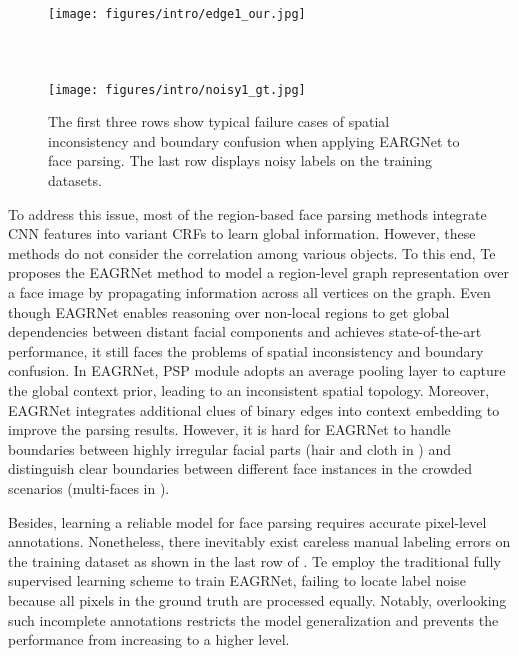 \documentclass[10pt,twocolumn,letterpaper]{article}
\begin{document}
\begin{figure}
{\begin{minipage}[t]{0.185\linewidth}
    \\ \\[-2.7ex]
    \texttt{[image: figures/intro/edge1\_our.jpg]}
    \\ \\[-2.7ex]
    \\ \\
    \texttt{[image: figures/intro/noisy1\_gt.jpg]}
    \end{minipage}
}
\vspace{-2.5mm}
\caption{The first three rows show typical failure cases of spatial inconsistency and boundary confusion when applying EARGNet \cite{te2020edge} to face parsing. The last row displays noisy labels on the training datasets.}
\vspace{-6mm}
\label{fig:failure_case_of_fcn}
\end{figure}

To address this issue, most of the region-based face parsing methods \cite{multi_objective, cnn_cascade, Zhou2017FacePV} integrate CNN features into variant CRFs to learn global information. However, these methods do not consider the correlation among various objects. To this end, Te \etal \cite{te2020edge} proposes the EAGRNet method to model a region-level graph representation over a face image by propagating information across all vertices on the graph. Even though EAGRNet enables reasoning over non-local regions to get global dependencies between distant facial components and achieves state-of-the-art performance, it still faces the problems of spatial inconsistency and boundary confusion. 
In EAGRNet, PSP module \cite{psp} adopts an average pooling layer \cite{Long_2015_CVPR} to capture the global context prior, leading to an inconsistent spatial topology. 
Moreover, EAGRNet integrates additional clues of binary edges into context embedding to improve the parsing results. However, it is hard for EAGRNet to handle boundaries between highly irregular facial parts (\eg hair and cloth in \figureautorefname{ \ref{fig:failure_case_of_fcn}}) and distinguish clear boundaries between different face instances in the crowded scenarios (multi-faces in \figureautorefname{ \ref{fig:failure_case_of_fcn}}). 

Besides, learning a reliable model for face parsing requires accurate pixel-level annotations. Nonetheless, there inevitably exist careless manual labeling errors on the training dataset as shown in the last row of \figureautorefname{ \ref{fig:failure_case_of_fcn}}. 
Te \etal \cite{te2020edge} employ the traditional fully supervised learning scheme to train EAGRNet, failing to locate label noise because all pixels in the ground truth are processed equally. Notably, overlooking such incomplete annotations restricts the model generalization and prevents the performance from increasing to a higher level.
\end{document}
